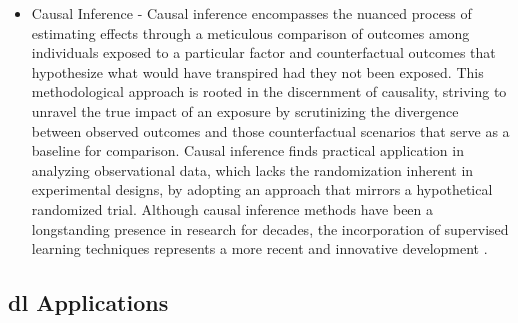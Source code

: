 \begin{itemize}
\item Causal Inference - Causal inference encompasses the nuanced process of estimating effects through a meticulous comparison of outcomes among individuals exposed to a particular factor and counterfactual outcomes that hypothesize what would have transpired had they not been exposed. This methodological approach is rooted in the discernment of causality, striving to unravel the true impact of an exposure by scrutinizing the divergence between observed outcomes and those counterfactual scenarios that serve as a baseline for comparison. Causal inference finds practical application in analyzing observational data, which lacks the randomization inherent in experimental designs, by adopting an approach that mirrors a hypothetical randomized trial. Although causal inference methods have been a longstanding presence in research for decades, the incorporation of supervised learning techniques represents a more recent and innovative development \cite{JIANG2020675}.
\end{itemize}



\subsection{\acrshort{dl} Applications}


